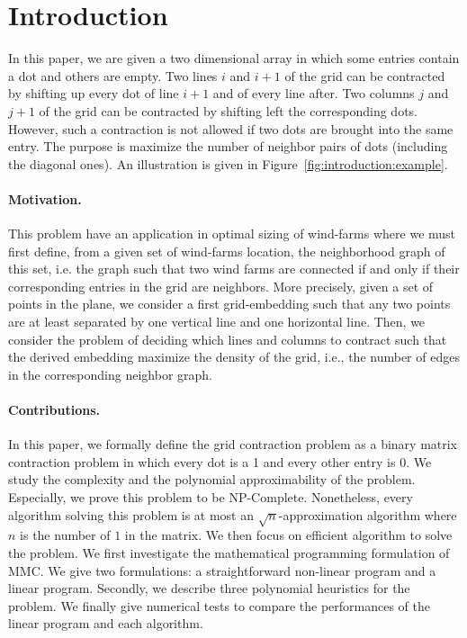\section{Introduction}
\label{sect:intro}


In this paper, we are given a two dimensional array in which some entries contain a dot and others are empty. Two lines $i$ and $i+1$ of the grid can be contracted by shifting up every dot of line $i+1$ and of every line after. Two columns $j$ and $j+1$ of the grid can be contracted by shifting left the corresponding dots. However, such a contraction is not allowed if two dots are brought into the same entry. The purpose is maximize the number of neighbor pairs of dots (including the diagonal ones). An illustration is given in Figure~\ref{fig:introduction:example}.




\paragraph{Motivation. }
This problem have an application in optimal sizing of wind-farms \cite{Pillai2015} where we must first define, from a given set of wind-farms location, the neighborhood graph of this set, i.e. the graph such that two wind farms are connected if and only if their corresponding entries in the grid are neighbors. More precisely, given a set of points in the plane, we consider a first grid-embedding such that any two points are at least separated by one vertical line and one horizontal line. Then, we consider the problem of deciding which lines and columns to contract such that the derived embedding maximize the density of the grid, i.e., the number of edges in the corresponding neighbor graph.
\vspace{-0.2cm}
\paragraph{Contributions. } In this paper, we formally define the grid contraction problem as a binary matrix contraction problem in which every dot is a 1 and every other entry is 0. We study the complexity and the polynomial approximability of the problem. Especially, we prove this problem to be NP-Complete. Nonetheless, every algorithm solving this problem is at most an $\sqrt{n}$-approximation algorithm where $n$ is the number of $1$ in the matrix. We then focus on efficient algorithm to solve the problem. We first investigate the mathematical programming formulation of MMC. We give two formulations: a straightforward non-linear program and a linear program.
Secondly, we describe three polynomial heuristics for the problem. We finally give numerical tests to compare the performances of the linear program and each algorithm. 

